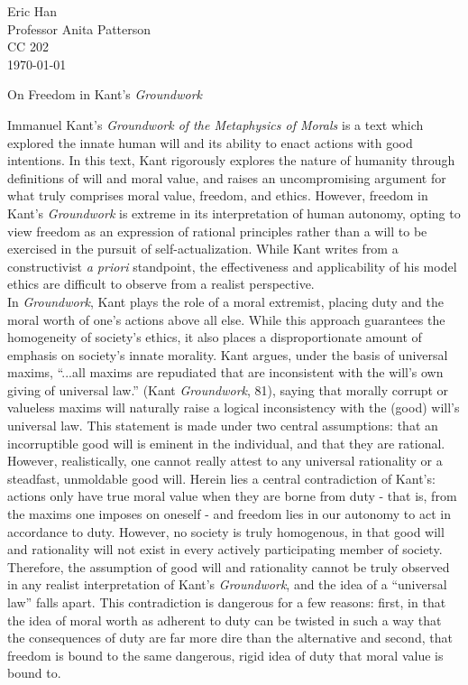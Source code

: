 \documentclass[12pt]{article}
\begin{document}
\begin{flushleft}

Eric Han\\
Professor Anita Patterson\\
CC 202\\
\today \\


\begin{center}
On Freedom in Kant's \textit{Groundwork}
\end{center}


\setlength{\parindent}{0.5in}

Immanuel Kant's \textit{Groundwork of the Metaphysics of Morals} is a text which explored the innate human will and its ability to enact actions with good intentions. In this text, Kant rigorously explores the nature of humanity through definitions of will and moral value, and raises an uncompromising argument for what truly comprises moral value, freedom, and ethics. However, freedom in Kant's \textit{Groundwork} is extreme in its interpretation of human autonomy, opting to view freedom as an expression of rational principles rather than a will to be exercised in the pursuit of self-actualization. While Kant writes from a constructivist \textit{a priori} standpoint, the effectiveness and applicability of his model ethics are difficult to observe from a realist perspective.\\
In \textit{Groundwork}, Kant plays the role of a moral extremist, placing duty and the moral worth of one's actions above all else. While this approach guarantees the homogeneity of society's ethics, it also places a disproportionate amount of emphasis on society's innate morality. Kant argues, under the basis of universal maxims, ``...all maxims are repudiated that are inconsistent with the will's own giving of universal law.'' (Kant \textit{Groundwork}, 81), saying that morally corrupt or valueless maxims will naturally raise a logical inconsistency with the (good) will's universal law. This statement is made under two central assumptions: that an incorruptible good will is eminent in the individual, and that they are rational. However, realistically, one cannot really attest to any universal rationality or a steadfast, unmoldable good will. Herein lies a central contradiction of Kant's: actions only have true moral value when they are borne from duty - that is, from the maxims one imposes on oneself - and freedom lies in our autonomy to act in accordance to duty. However, no society is truly homogenous, in that good will and rationality will not exist in every actively participating member of society. Therefore, the assumption of good will and rationality cannot be truly observed in any realist interpretation of Kant's \textit{Groundwork}, and the idea of a ``universal law'' falls apart. This contradiction is dangerous for a few reasons: first, in that the idea of moral worth as adherent to duty can be twisted in such a way that the consequences of duty are far more dire than the alternative and second, that freedom is bound to the same dangerous, rigid idea of duty that moral value is bound to. \\

\end{flushleft}
\end{document}
